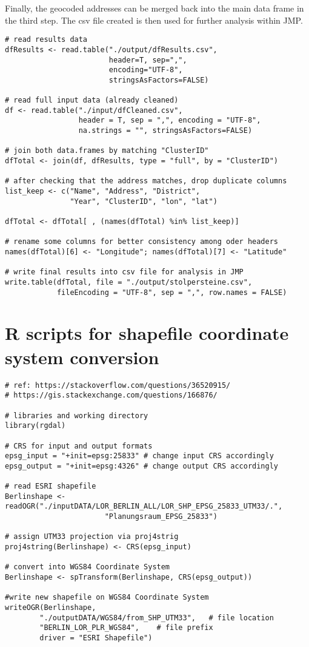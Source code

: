 Finally, the geocoded addresses can be merged back into the main data frame in the third step. The csv file created is then used for further analysis within JMP.

\begin{lstlisting}[title=R code to geocode addresses (3)]
# read results data
dfResults <- read.table("./output/dfResults.csv",
						header=T, sep=",",
						encoding="UTF-8",
						stringsAsFactors=FALSE)

# read full input data (already cleaned)
df <- read.table("./input/dfCleaned.csv",
				 header = T, sep = ",", encoding = "UTF-8",
				 na.strings = "", stringsAsFactors=FALSE)

# join both data.frames by matching "ClusterID"
dfTotal <- join(df, dfResults, type = "full", by = "ClusterID")

# after checking that the address matches, drop duplicate columns
list_keep <- c("Name", "Address", "District",
			   "Year", "ClusterID", "lon", "lat")
			   
dfTotal <- dfTotal[ , (names(dfTotal) %in% list_keep)]

# rename some columns for better consistency among oder headers
names(dfTotal)[6] <- "Longitude"; names(dfTotal)[7] <- "Latitude"

# write final results into csv file for analysis in JMP
write.table(dfTotal, file = "./output/stolpersteine.csv",
			fileEncoding = "UTF-8", sep = ",", row.names = FALSE)
\end{lstlisting}


\section{R scripts for shapefile coordinate system conversion}
\label{app:shapefile_conv}



\begin{lstlisting}[title=R code to convert shapefile from UTM33 N to WGS84]
# ref: https://stackoverflow.com/questions/36520915/
# https://gis.stackexchange.com/questions/166876/

# libraries and working directory
library(rgdal)

# CRS for input and output formats
epsg_input = "+init=epsg:25833" # change input CRS accordingly
epsg_output = "+init=epsg:4326" # change output CRS accordingly

# read ESRI shapefile 
Berlinshape <- readOGR("./inputDATA/LOR_BERLIN_ALL/LOR_SHP_EPSG_25833_UTM33/.",
					   "Planungsraum_EPSG_25833")

# assign UTM33 projection via proj4strig
proj4string(Berlinshape) <- CRS(epsg_input)

# convert into WGS84 Coordinate System
Berlinshape <- spTransform(Berlinshape, CRS(epsg_output))

#write new shapefile on WGS84 Coordinate System 
writeOGR(Berlinshape,
		"./outputDATA/WGS84/from_SHP_UTM33",   # file location
		"BERLIN_LOR_PLR_WGS84",    # file prefix
		driver = "ESRI Shapefile")
\end{lstlisting}


